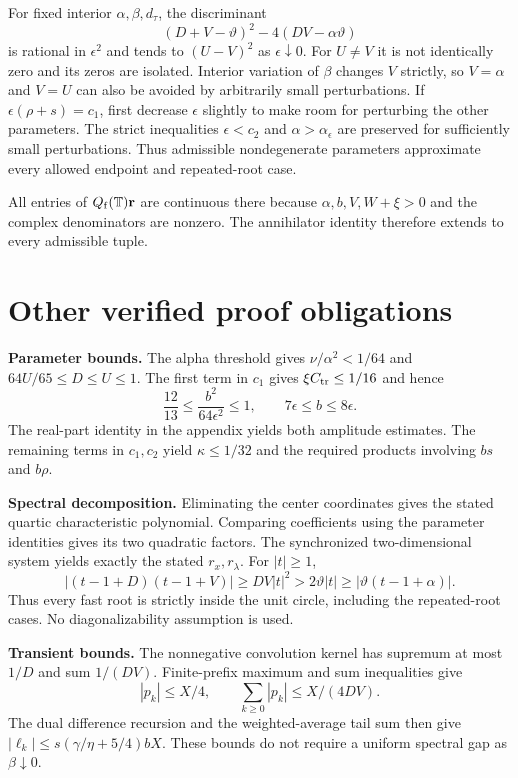 \documentclass[10pt]{article}
\begin{document}
For fixed interior $\alpha,\beta,d_\tau$, the discriminant
\[
(D+V-\vartheta)^2-4(DV-\alpha\vartheta)
\]
is rational in $\epsilon^2$ and tends to $(U-V)^2$ as $\epsilon\downarrow0$.
For $U\ne V$ it is not identically zero and its zeros are isolated. Interior
variation of $\beta$ changes $V$ strictly, so $V=\alpha$ and $V=U$ can also
be avoided by arbitrarily small perturbations. If
$\epsilon(\rho+s)=c_1$, first decrease $\epsilon$ slightly to make room for
perturbing the other parameters. The strict inequalities
$\epsilon<c_2$ and $\alpha>\alpha_\epsilon$ are preserved for sufficiently
small perturbations. Thus admissible nondegenerate parameters approximate
every allowed endpoint and repeated-root case.

All entries of $Q_{\rm f}(\mathbb T)\mathbf r$ are continuous there because
$\alpha,b,V,W+\xi>0$ and the complex denominators are nonzero. The annihilator
identity therefore extends to every admissible tuple.

\section*{Other verified proof obligations}
\textbf{Parameter bounds.} The alpha threshold gives
$\nu/\alpha^2<1/64$ and $64U/65\le D\le U\le1$.
The first term in $c_1$ gives $\xi C_{\rm tr}\le1/16$ and hence
\[
\frac{12}{13}\le\frac{b^2}{64\epsilon^2}\le1,
\qquad 7\epsilon\le b\le8\epsilon.
\]
The real-part identity in the appendix yields both amplitude estimates.
The remaining terms in $c_1,c_2$ yield $\kappa\le1/32$ and the required
products involving $bs$ and $b\rho$.

\textbf{Spectral decomposition.} Eliminating the center coordinates gives the
stated quartic characteristic polynomial. Comparing coefficients using the
parameter identities gives its two quadratic factors. The synchronized
two-dimensional system yields exactly the stated $r_x,r_\lambda$.
For $|t|\ge1$,
\[
|(t-1+D)(t-1+V)|\ge DV|t|^2
>2\vartheta|t|\ge|\vartheta(t-1+\alpha)|.
\]
Thus every fast root is strictly inside the unit circle, including the
repeated-root cases. No diagonalizability assumption is used.

\textbf{Transient bounds.} The nonnegative convolution kernel has supremum
at most $1/D$ and sum $1/(DV)$. Finite-prefix maximum and sum inequalities
give
\[
|p_k|\le X/4,\qquad \sum_{k\ge0}|p_k|\le X/(4DV).
\]
The dual difference recursion and the weighted-average tail sum then give
$|\ell_k|\le s(\gamma/\eta+5/4)bX$. These bounds do not require a uniform
spectral gap as $\beta\downarrow0$.
\end{document}
